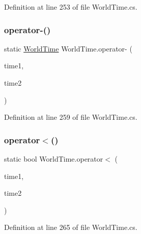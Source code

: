 Definition at line 253 of file World\+Time.\+cs.

\mbox{\label{struct_world_time_a53dfaf2ff24a15d49a2b5e7f11325206}} 
\subsubsection{\texorpdfstring{operator-\/()}{operator-()}}
{\footnotesize\ttfamily static \hyperlink{struct_world_time}{World\+Time} World\+Time.\+operator-\/ (\begin{DoxyParamCaption}\item[{\hyperlink{struct_world_time}{World\+Time}}]{time1,  }\item[{\hyperlink{struct_world_time}{World\+Time}}]{time2 }\end{DoxyParamCaption})\hspace{0.3cm}{\ttfamily [static]}}



Definition at line 259 of file World\+Time.\+cs.

\mbox{\label{struct_world_time_ab96005f93380c605d0c2aafba0b1691e}} 
\subsubsection{\texorpdfstring{operator$<$()}{operator<()}}
{\footnotesize\ttfamily static bool World\+Time.\+operator$<$ (\begin{DoxyParamCaption}\item[{\hyperlink{struct_world_time}{World\+Time}}]{time1,  }\item[{\hyperlink{struct_world_time}{World\+Time}}]{time2 }\end{DoxyParamCaption})\hspace{0.3cm}{\ttfamily [static]}}



Definition at line 265 of file World\+Time.\+cs.

\mbox{\label{struct_world_time_ab78a3eaa6f017c1e3c62528321ff47fd}} 
